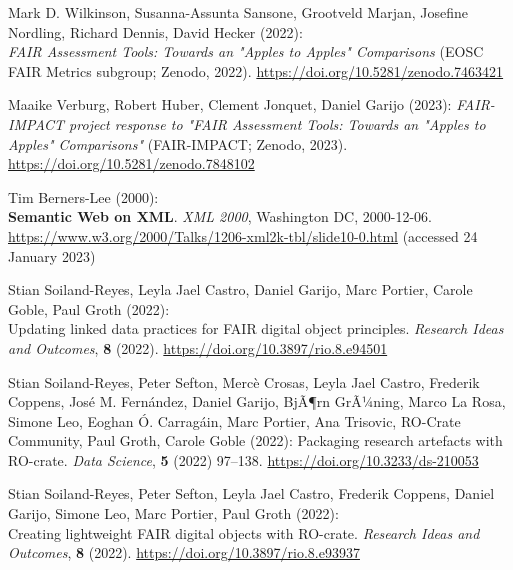 \begin{thebibliography}{9}
Mark D. Wilkinson, Susanna-Assunta Sansone, Grootveld Marjan, Josefine
Nordling, Richard Dennis, David Hecker (2022): \\
\emph{{FAIR Assessment
Tools: Towards an "Apples to Apples" Comparisons}} ({EOSC} {FAIR}
Metrics subgroup; Zenodo, 2022).
\url{https://doi.org/10.5281/zenodo.7463421}

Maaike Verburg, Robert Huber, Clement Jonquet, Daniel Garijo (2023):
\emph{{FAIR-IMPACT project response to "FAIR Assessment Tools: Towards
an "Apples to Apples" Comparisons"}} ({FAIR-IMPACT}; Zenodo, 2023).
\url{https://doi.org/10.5281/zenodo.7848102}

Tim Berners-Lee (2000): \\
\textbf{Semantic Web on XML}. 
\emph{XML 2000}, Washington DC, 2000-12-06. \\
\url{https://www.w3.org/2000/Talks/1206-xml2k-tbl/slide10-0.html}
(accessed 24 January 2023)

Stian Soiland-Reyes, Leyla Jael Castro, Daniel Garijo, Marc Portier,
Carole Goble, Paul Groth (2022): \\
Updating linked data practices for
{FAIR} digital object principles. \emph{Research Ideas and Outcomes},
\textbf{8} (2022).
\url{https://doi.org/10.3897/rio.8.e94501}

Stian Soiland-Reyes, Peter Sefton, Mercè Crosas, Leyla Jael Castro,
Frederik Coppens, José M. Fernández, Daniel Garijo, BjÃ¶rn GrÃ¼ning,
Marco La Rosa, Simone Leo, Eoghan Ó. Carragáin, Marc Portier, Ana
Trisovic, RO-Crate Community, Paul Groth, Carole Goble (2022):
Packaging research artefacts with {RO}-crate. \emph{Data Science},
\textbf{5} (2022) 97--138.
\url{https://doi.org/10.3233/ds-210053}

Stian Soiland-Reyes, Peter Sefton, Leyla Jael Castro, Frederik Coppens,
Daniel Garijo, Simone Leo, Marc Portier, Paul Groth (2022): \\
Creating
lightweight {FAIR} digital objects with {RO}-crate. \emph{Research Ideas
and Outcomes}, \textbf{8} (2022).
\url{https://doi.org/10.3897/rio.8.e93937}



\end{thebibliography}